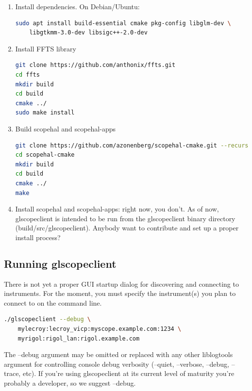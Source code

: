 \documentclass[11pt]{article}
\begin{document}
\begin{enumerate}

\item Install dependencies. On Debian/Ubuntu:
\begin{lstlisting}[language=sh]
sudo apt install build-essential cmake pkg-config libglm-dev \
	libgtkmm-3.0-dev libsigc++-2.0-dev
\end{lstlisting}

\item Install FFTS library
\begin{lstlisting}[language=sh]
git clone https://github.com/anthonix/ffts.git
cd ffts
mkdir build
cd build
cmake ../
sudo make install
\end{lstlisting}

\item Build scopehal and scopehal-apps
\begin{lstlisting}[language=sh]
git clone https://github.com/azonenberg/scopehal-cmake.git --recurse-submodules
cd scopehal-cmake
mkdir build
cd build
cmake ../
make
\end{lstlisting}

\item Install scopehal and scopehal-apps: right now, you don't. As of now, glscopeclient is intended to be run from the
glscopeclient binary directory (build/src/glscopeclient). Anybody want to contribute and set up a proper install
process?

\end{enumerate}

\subsection{Running glscopeclient}

There is not yet a proper GUI startup dialog for discovering and connecting to instruments. For the moment, you must
specify the instrument(s) you plan to connect to on the command line.

\begin{lstlisting}[language=sh]
./glscopeclient --debug \
	mylecroy:lecroy_vicp:myscope.example.com:1234 \
	myrigol:rigol_lan:rigol.example.com
\end{lstlisting}

The --debug argument may be omitted or replaced with any other liblogtools argument for controlling console debug
verbosity (--quiet, --verbose, --debug, --trace, etc). If you're using glscopeclient at its current level of maturity
you're probably a developer, so we suggest --debug.
\end{document}
